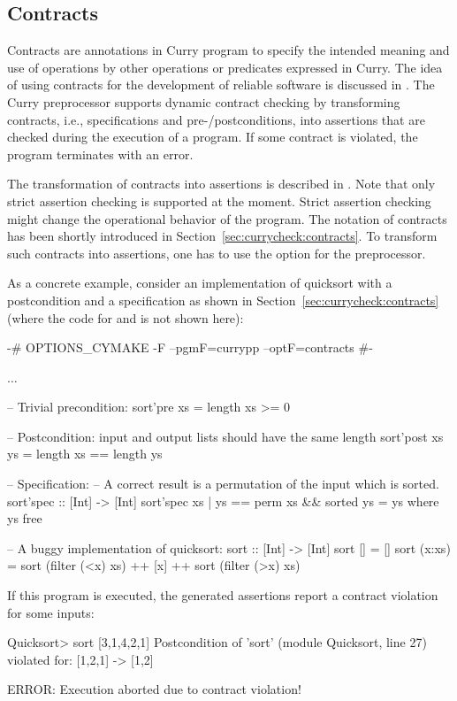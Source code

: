 \subsection{Contracts}

Contracts are annotations in Curry program to specify the
intended meaning and use of operations by other operations
or predicates expressed in Curry.
The idea of using contracts for the development
of reliable software is discussed in \cite{AntoyHanus12PADL}.
The Curry preprocessor supports dynamic contract checking
by transforming contracts, i.e., specifications and
pre-/postconditions, into assertions that are checked
during the execution of a program.
If some contract is violated, the program terminates
with an error.

The transformation of contracts into assertions is described
in \cite{AntoyHanus12PADL}.
Note that only strict assertion checking is supported
at the moment.
Strict assertion checking might change the operational behavior
of the program.
The notation of contracts has been shortly introduced
in Section~\ref{sec:currycheck:contracts}.
To transform such contracts into assertions,
one has to use the option  for the preprocessor.

As a concrete example, consider an implementation of quicksort
with a postcondition and a specification as shown in
Section~\ref{sec:currycheck:contracts}
(where the code for  and  is not shown here):
%
\begin{curry}
{-# OPTIONS_CYMAKE -F --pgmF=currypp --optF=contracts #-}

$\ldots$

-- Trivial precondition:
sort'pre xs = length xs >= 0

-- Postcondition: input and output lists should have the same length
sort'post xs ys = length xs == length ys

-- Specification:
-- A correct result is a permutation of the input which is sorted.
sort'spec :: [Int] -> [Int]
sort'spec xs | ys == perm xs && sorted ys = ys  where ys free

-- A buggy implementation of quicksort:
sort :: [Int] -> [Int]
sort []     = []
sort (x:xs) = sort (filter (<x) xs) ++ [x] ++ sort (filter (>x) xs)
\end{curry}
%
If this program is executed, the generated assertions report
a contract violation for some inputs:
%
\begin{curry}
Quicksort> sort [3,1,4,2,1]
Postcondition of 'sort' (module Quicksort, line 27) violated for:
[1,2,1] -> [1,2]

ERROR: Execution aborted due to contract violation!
\end{curry}



